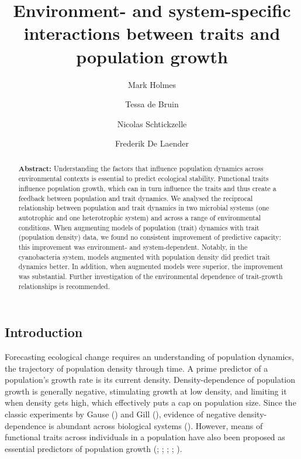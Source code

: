 \documentclass[
  letterpaper,
  DIV=11,
  numbers=noendperiod]{scrartcl}
\title{Environment- and system-specific interactions between traits and
population growth}
\author{Mark Holmes \and Tessa de Bruin \and Nicolas
Schtickzelle \and Frederik De Laender}
\date{}
\begin{document}
\maketitle
\begin{abstract}
\textbf{Abstract:} Understanding the factors that influence population
dynamics across environmental contexts is essential to predict
ecological stability. Functional traits influence population growth,
which can in turn influence the traits and thus create a feedback
between population and trait dynamics. We analysed the reciprocal
relationship between population and trait dynamics in two microbial
systems (one autotrophic and one heterotrophic system) and across a
range of environmental conditions. When augmenting models of population
(trait) dynamics with trait (population density) data, we found no
consistent improvement of predictive capacity: this improvement was
environment- and system-dependent. Notably, in the cyanobacteria system,
models augmented with population density did predict trait dynamics
better. In addition, when augmented models were superior, the
improvement was substantial. Further investigation of the environmental
dependence of trait-growth relationships is recommended.
\end{abstract}
\subsection{Introduction}\label{sec-DAE_introduction}

Forecasting ecological change requires an understanding of population
dynamics, the trajectory of population density through time. A prime
predictor of a population's growth rate is its current density.
Density-dependence of population growth is generally negative,
stimulating growth at low density, and limiting it when density gets
high, which effectively puts a cap on population size. Since the classic
experiments by Gause () and Gill
(), evidence of negative density-dependence
is abundant across biological systems (). However, means of functional traits across individuals in a
population have also been proposed as essential predictors of population
growth (;
;
;
;
).
\end{document}
